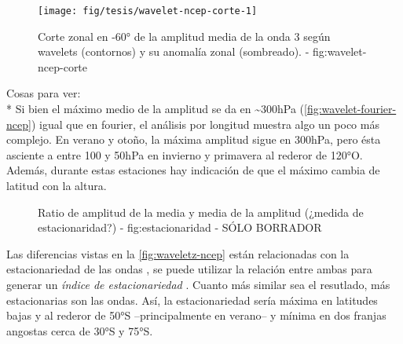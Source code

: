\documentclass[spanish,a4paper]{book}
\begin{document}

\begin{figure}

{\centering \texttt{[image: fig/tesis/wavelet-ncep-corte-1]} 

}

\caption{Corte zonal en -60° de la amplitud media de la onda 3 según wavelets (contornos) y su anomalía zonal (sombreado). - fig:wavelet-ncep-corte}\label{fig:wavelet-ncep-corte}
\end{figure}

Cosas para ver:\\
* Si bien el máximo medio de la amplitud se da en
\textasciitilde{}300hPa (\autoref{fig:wavelet-fourier-ncep}) igual que
en fourier, el análisis por longitud muestra algo un poco más complejo.
En verano y otoño, la máxima amplitud sigue en 300hPa, pero ésta
asciente a entre 100 y 50hPa en invierno y primavera al rederor de
120°O. Además, durante estas estaciones hay indicación de que el máximo
cambia de latitud con la altura.

\begin{figure}
\newline{}\caption{Ratio de amplitud de la media y media de la amplitud (¿medida de estacionaridad?) - fig:estacionaridad - SÓLO BORRADOR}\label{fig:estacionaridad}
\end{figure}

Las diferencias vistas en la \autoref{fig:waveletz-ncep} están
relacionadas con la estacionariedad de las ondas
,
se puede utilizar la relación entre ambas para generar un \emph{índice
de estacionariedad} . Cuanto más
similar sea el resutlado, más estacionarias son las ondas. Así, la
estacionariedad sería máxima en latitudes bajas y al rederor de 50°S
--principalmente en verano-- y mínima en dos franjas angostas cerca de
30°S y 75°S. 
\end{document}
